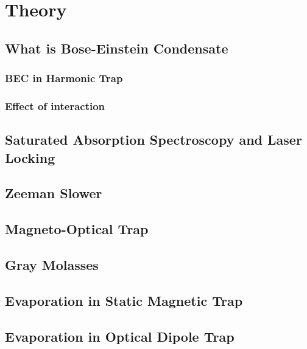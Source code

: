 \chapter{Theory}

\section{What is Bose-Einstein Condensate}\label{ch1:bec}
\subsection{BEC in Harmonic Trap}
\subsection{Effect of interaction}

\section{Saturated Absorption Spectroscopy and Laser Locking}

\section{Zeeman Slower}

\section{Magneto-Optical Trap}

\section{Gray Molasses}

\section{Evaporation in Static Magnetic Trap}

\section{Evaporation in Optical Dipole Trap}
